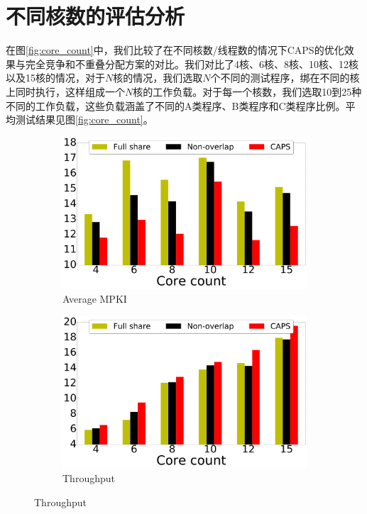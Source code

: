 \section{不同核数的评估分析}

在图\ref{fig:core_count}中，我们比较了在不同核数/线程数的情况下CAPS的优化效果与完全竞争和不重叠分配方案的对比。我们对比了4核、6核、8核、10核、12核以及15核的情况，对于$N$核的情况，我们选取$N$个不同的测试程序，绑在不同的核上同时执行，这样组成一个$N$核的工作负载。对于每一个核数，我们选取10到25种不同的工作负载，这些负载涵盖了不同的A类程序、B类程序和C类程序比例。平均测试结果见图\ref{fig:core_count}。

\begin{figure}[htbp] 
    \centering
    \begin{subfigure}[b]{0.5\linewidth}
        \centering\includegraphics[width=0.9\linewidth]{figures/mpki.pdf}
        \caption{Average MPKI}
    \end{subfigure}%
    \begin{subfigure}[b]{0.5\linewidth}
        \centering\includegraphics[width=0.9\linewidth]{figures/ipc.pdf}
        \caption{Throughput}

\end{subfigure}
\end{figure}
